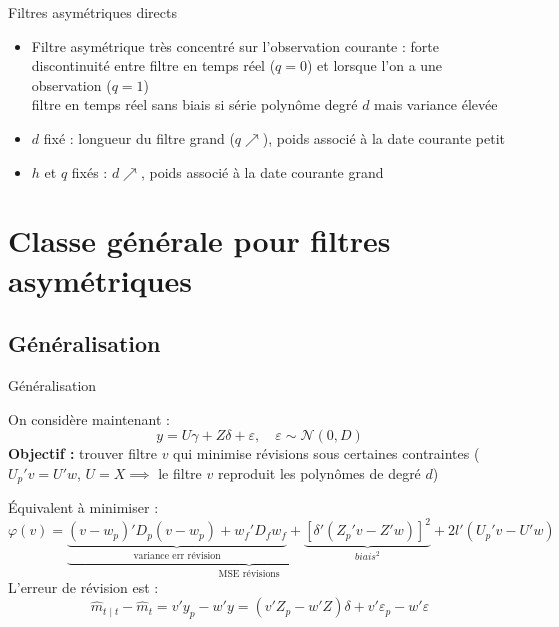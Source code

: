 \documentclass[10pt,xcolor=table,color={dvipsnames,usenames},ignorenonframetext,usepdftitle=false,french]{beamer}
\begin{document}
\begin{frame}{Filtres asymétriques directs}
\protect\hypertarget{filtres-asymuxe9triques-directs}{}

\begin{itemize}
\item
  Filtre asymétrique très concentré sur l'observation courante : forte
  discontinuité entre filtre en temps réel (\(q=0\)) et lorsque l'on a
  une observation (\(q=1\))\\
  \faArrowCircleRight{} filtre en temps réel sans biais si série
  polynôme degré \(d\) mais variance élevée \pause
\item
  \(d\) fixé : \faPlusCircle{} longueur du filtre grand (\(q\nearrow\)),
  \faPlusCircle{} poids associé à la date courante petit
\item
  \(h\) et \(q\) fixés : \faPlusCircle{} \(d\nearrow\), \faPlusCircle{}
  poids associé à la date courante grand
\end{itemize}

\end{frame}

\hypertarget{classe-guxe9nuxe9rale-pour-filtres-asymuxe9triques}{%
\section{Classe générale pour filtres
asymétriques}\label{classe-guxe9nuxe9rale-pour-filtres-asymuxe9triques}}

\hypertarget{guxe9nuxe9ralisation}{%
\subsection{Généralisation}\label{guxe9nuxe9ralisation}}

\begin{frame}{Généralisation}
\protect\hypertarget{guxe9nuxe9ralisation-1}{}

On considère maintenant : \[
y=U\gamma+Z\delta+\varepsilon,\quad
\varepsilon\sim\mathcal{N}(0,D)
\] \textbf{Objectif :} trouver filtre \(v\) qui minimise révisions sous
certaines contraintes (\(U_{p}'v=U'w\), \(U=X\implies\) le filtre \(v\)
reproduit les polynômes de degré \(d\))

Équivalent à minimiser : \[
\varphi(v)=
\underbrace{
  \underbrace{(v-w_{p})'D_{p}(v-w_{p})+
  w_{f}'D_{f}w_{f}}_\text{variance err révision}+
  \underbrace{[\delta'(Z_{p}'v-Z'w)]^{2}}_{biais^2}
}_\text{MSE révisions}+
2l'(U_{p}'v-U'w)
\] L'erreur de révision est : \[
\hat{m}_{t\mid t}-\hat{m}_{t}=v'y_{p}-w'y=(v'Z_{p}-w'Z)\delta+v'\varepsilon_{p}-w'\varepsilon
\]

\end{frame}
\end{document}
